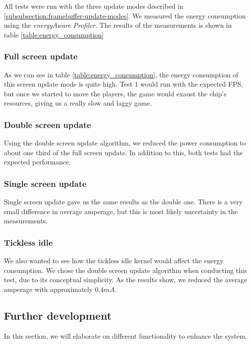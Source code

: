 All tests were run with the three update modes described in \ref{subsubsection:framebuffer-update-modes}. We measured the energy consumption using the \emph{energyAware Profiler}. The results of the measurements is shown in table \ref{table:energy_consumption}



\subsubsection{Full screen update}
As we can see in table \ref{table:energy_consumption}, the energy consumption of this screen update mode is quite high. Test 1 would run with the expected FPS, but once we started to move the players, the game would exaust the chip's resources, giving us a really slow and laggy game.

\subsubsection{Double screen update}
Using the double screen update algorithm, we reduced the power consumption to about one third of the full screen update. In addition to this, both tests had the expected performance.

\subsubsection{Single screen update}
Single screen update gave us the same results as the double one. There is a very small difference in average amperage, but this is most likely uncertainty in the measurements.

\subsubsection{Tickless idle}
We also wanted to see how the tickless idle kernel would affect the energy consumption. We chose the double screen update algorithm when conducting this test, due to its conceptual simplicity. As the results show, we reduced the average amperage with approximately $0.4mA$.

\subsection{Further development}
In this section, we will elaborate on different functionality to enhance the system.

